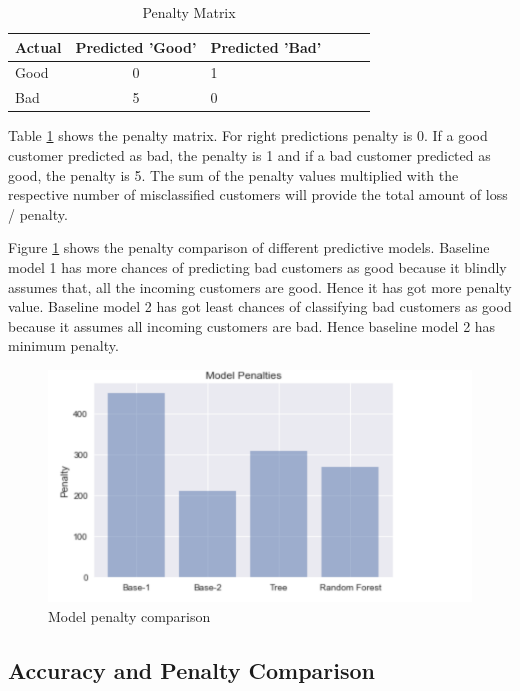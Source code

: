 \documentclass[sigconf]{acmart}
\begin{document}
\begin{table}
  \caption{Penalty Matrix
  \cite{psu-site}}
  \label{tab:table8}
  \begin{tabular}{lclclc}
    \toprule
     Actual& Predicted 'Good'& Predicted 'Bad'\\
    \midrule
    Good& 0& 1\\
    Bad& 5& 0\\
    \bottomrule
  \end{tabular}
\end{table}

Table \ref{tab:table8} shows the penalty matrix. For right predictions penalty is 0. If a good customer predicted as bad, the penalty is 1 and if a bad customer predicted as good, the penalty is 5. The sum of the penalty values multiplied with the respective number of misclassified customers will provide the total amount of loss / penalty.

Figure \ref{fig:Figure20} shows the penalty comparison of different predictive models. Baseline model 1 has more chances of predicting bad customers as good because it blindly assumes that, all the incoming customers are good. Hence it has got more penalty value. Baseline model 2 has got least chances of classifying bad customers as good because it assumes all incoming customers are bad. Hence baseline model 2 has minimum penalty. 

\begin{figure}[htb]
  \centering
  \includegraphics[width=1.0\columnwidth]{images/Figure20.png}
  \caption{Model penalty comparison
  \cite{german-credit-sri-sai}}
  \label{fig:Figure20} 
\end{figure}

\subsection{Accuracy and Penalty Comparison} 
\end{document}
